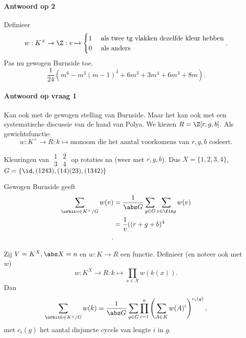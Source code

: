 \paragraph{Antwoord op 2}
Definieer \[
w:  K^{\times } \to \Z: v\mapsto  \begin{cases}
	1 & \text{ als twee tg vlakken dezelfde kleur hebben} \\
	0 & \text{ als anders}
\end{cases}
.\] 
Pas nu gewogen Burnside toe.
\[
	\frac{1}{24}\left( m^{6} - m^{3}(m - 1)^{3} + 6m^3 + 3 m^{4} + 6m^{3} + 8m \right) 
.\]

\paragraph{Antwoord op vraag 1} 
Kan ook met de gewogen stelling van Burnside. Maar het kan ook met een systematische discussie van de hand van Polya.
We kiezen $R = \Z[r, g, b]$. 
Als gewichtsfunctie: \[
	w: K^{\times } \to R: k\mapsto \text{monoom die het aantal voorkomens van $r, g, b$ codeert}
.\]
\begin{intermezzo}
	Kleuringen van $\begin{matrix} 1 & 2 \\ 3 & 4 \end{matrix} $ op rotaties na (weer met $r, g, b$). Dus  $X = \{1, 2, 3, 4\} $, $G = \{\id , (1243), (14)(23), (1342)\} $
	
	Gewogen Burnside geeft
	\begin{align*}
		\sum_{\orbit v \in K^{\times }/ G } w(v) &=  \frac{1}{\abs G} \sum_{ g\in G} \sum_{v \in \fix g} w(v) \\
							 &= \frac{1}{v}((r + g + b)^{4} \\
	.\end{align*} 
\end{intermezzo}

\begin{stelling}
	Zij $V = K^{X }, \abs X = n$ en $w: K \to R$ een functie. 
	Definieer (en noteer ook met $w$) \[
		w: K^{X} \to R: k\mapsto \prod_{x \in X} w(k(x))
	.\] 
	Dan \[
		\sum_{\orbit k \in K^{x} / G} w (k) = \frac{1}{\abs G} \sum_{g \in G} \prod_{i = 1}^{n} \left(\sum_{A \in K} w(A)^{i}\right)^{c_i(g)}
	,\] 
	met $c_i(g)$ het aantal disjuncte cycels van lengte $i$ in $g$.
\end{stelling}
